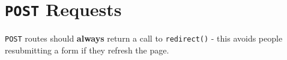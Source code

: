 \section{\texttt{POST} Requests}

\texttt{POST} routes should \textbf{always} return a call to \texttt{redirect()} - this avoids people resubmitting a form if they refresh the page.
